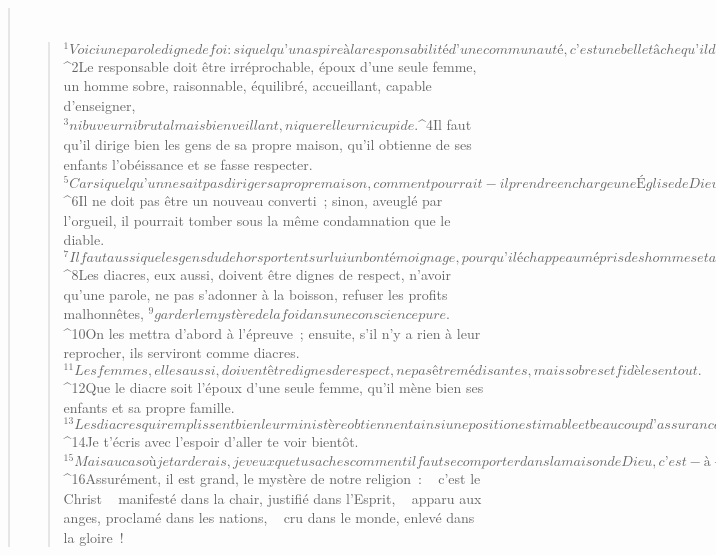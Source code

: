 \begin{verse}
         
      \bchapter{}
      \begin{verse}
${}^{1}Voici une parole digne de foi : si quelqu’un aspire à la responsabilité d’une communauté, c’est une belle tâche qu’il désire. 
${}^{2}Le responsable doit être irréprochable, époux d’une seule femme, un homme sobre, raisonnable, équilibré, accueillant, capable d’enseigner, 
${}^{3}ni buveur ni brutal mais bienveillant, ni querelleur ni cupide. 
${}^{4}Il faut qu’il dirige bien les gens de sa propre maison, qu’il obtienne de ses enfants l’obéissance et se fasse respecter. 
${}^{5}Car si quelqu’un ne sait pas diriger sa propre maison, comment pourrait-il prendre en charge une Église de Dieu ? 
${}^{6}Il ne doit pas être un nouveau converti ; sinon, aveuglé par l’orgueil, il pourrait tomber sous la même condamnation que le diable. 
${}^{7}Il faut aussi que les gens du dehors portent sur lui un bon témoignage, pour qu’il échappe au mépris des hommes et au piège du diable.
${}^{8}Les diacres, eux aussi, doivent être dignes de respect, n’avoir qu’une parole, ne pas s’adonner à la boisson, refuser les profits malhonnêtes, 
${}^{9}garder le mystère de la foi dans une conscience pure. 
${}^{10}On les mettra d’abord à l’épreuve ; ensuite, s’il n’y a rien à leur reprocher, ils serviront comme diacres. 
${}^{11}Les femmes, elles aussi, doivent être dignes de respect, ne pas être médisantes, mais sobres et fidèles en tout. 
${}^{12}Que le diacre soit l’époux d’une seule femme, qu’il mène bien ses enfants et sa propre famille. 
${}^{13}Les diacres qui remplissent bien leur ministère obtiennent ainsi une position estimable et beaucoup d’assurance grâce à leur foi au Christ Jésus.
${}^{14}Je t’écris avec l’espoir d’aller te voir bientôt. 
${}^{15}Mais au cas où je tarderais, je veux que tu saches comment il faut se comporter dans la maison de Dieu, c’est-à-dire la communauté, l’Église du Dieu vivant, elle qui est le pilier et le soutien de la vérité.
        ${}^{16}Assurément, il est grand, le mystère de notre religion :
       
        c’est le Christ
         
        manifesté dans la chair,
        justifié dans l’Esprit,
         
        apparu aux anges,
        proclamé dans les nations,
         
        cru dans le monde,
        enlevé dans la gloire !
      

\end{verse}
\end{verse}
